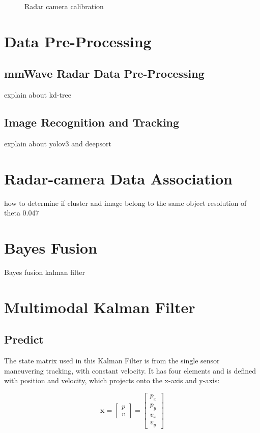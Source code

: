 \begin{figure}[hbpt]
    \caption{Radar camera calibration}
    \label{fig:radar_camera_calibration}
\end{figure}

\section{Data Pre-Processing}\label{sec:2-preprocessing}
\subsection{mmWave Radar Data Pre-Processing}\label{sec:2-kd_tree}
explain about kd-tree

\subsection{Image Recognition and Tracking}\label{sec:2-img_recognition}
explain about yolov3 and deepsort

\section{Radar-camera Data Association}\label{sec:2-association}
how to determine if cluster and image belong to the same object
resolution of theta 0.047

\section{Bayes Fusion}\label{sec:2-bayes_fusion}
Bayes fusion kalman filter 

\section{Multimodal Kalman Filter}\label{sec:2-kalman_filter}
\subsection{Predict}\label{sec:2-predict}
The state matrix used in this Kalman Filter is from the single sensor maneuvering tracking, with constant velocity.
It has four elements and is defined with position and velocity, which projects onto the x-axis and y-axis:

\begin{equation}\label{equ:state_eq}
\mathbf{x} = 
\begin{bmatrix} 
p \\ 
v 
\end{bmatrix} = 
\begin{bmatrix} 
p_x \\ 
p_y \\ 
v_x \\ 
v_y 
\end{bmatrix}
\end{equation}

